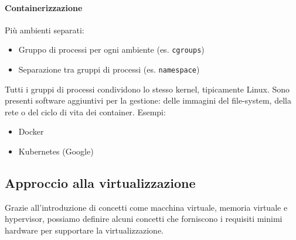 \documentclass{article}
\begin{document}
		\paragraph{Containerizzazione}
		Più ambienti separati:
		\begin{itemize}
		    \item Gruppo di processi per ogni ambiente (es. \verb*|cgroups|)
		    \item Separazione tra gruppi di processi (es. \verb*|namespace|)
		\end{itemize}  
		Tutti i gruppi di processi condividono lo stesso kernel, tipicamente Linux. Sono presenti software aggiuntivi per la gestione: delle immagini del file-system, della rete o del ciclo di vita dei container.\newline
		Esempi:
		\begin{itemize}
		    \item Docker
		    \item Kubernetes (Google)
		\end{itemize}
		
		\subsection{Approccio alla virtualizzazione}
		Grazie all'introduzione di concetti come macchina virtuale, memoria virtuale e hypervisor, possiamo definire alcuni concetti che forniscono i requisiti minimi hardware per supportare la virtualizzazione.\\
		
\end{document}
